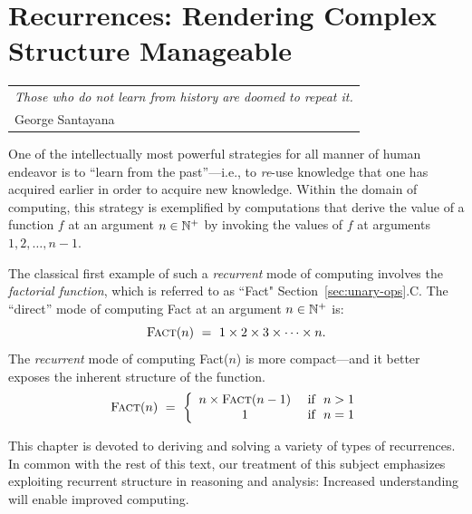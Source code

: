 
\chapter{Recurrences:
Rendering Complex Structure Manageable}
\label{ch:Recurrences}

\hfill
\begin{tabular}{l}
{\em Those who do not learn from history are doomed to repeat it.} \\
\hfill {\small George Santayana}
\end{tabular}


\vspace*{.5in}

\noindent
One of the intellectually most powerful strategies for all manner of human endeavor is to ``learn from the past''---i.e., to {\em re}-use knowledge that one has acquired earlier in order to acquire new knowledge.  Within the domain of computing, this strategy is exemplified by computations that derive the value of a function $f$ at an argument $n \in \mathbb{N}^+$ by invoking the values of $f$ at arguments $1, 2, \ldots, n-1$.

\smallskip

The classical first example of such a {\it recurrent} mode of computing involves the {\it factorial function}, which is referred to as ``{\sc Fact}" Section~\ref{sec:unary-ops}.C.  The ``direct'' mode of computing {\sc Fact} at an argument $n \in \mathbb{N}^+$ is:
\[ \mbox{\sc Fact}(n) \ = \ 1 \times 2 \times 3 \times \cdots \times n. \]
The {\em recurrent} mode of computing {\sc Fact}($n$) is more compact---and it better exposes the inherent structure of the function.
\[ \mbox{\sc Fact}(n) \ = \ \left\{
\begin{array}{cl}
 n \times \mbox{\sc Fact}(n-1) & \mbox{ if } \ n > 1 \\
 1 & \mbox{ if } \ n = 1 \\
\end{array}
\right.
\]

\smallskip

This chapter is devoted to deriving and solving a variety of types of recurrences.  In common with the rest of this text, our treatment of this subject emphasizes exploiting recurrent structure in reasoning and analysis: Increased understanding will enable improved computing.


